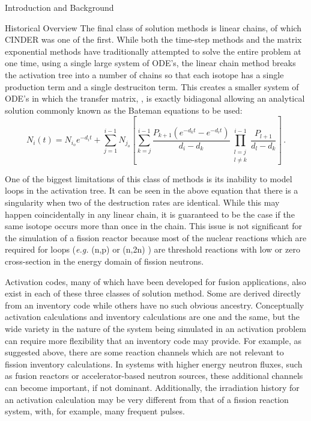 \begin{chapter}{Introduction and Background}
\begin{section}{Historical Overview}
  The final class of solution methods is linear chains, of which
  CINDER was one of the first.  While both the time-step methods and
  the matrix exponential methods have traditionally attempted to solve
  the entire problem at one time, using a single large system of
  ODE's, the linear chain method breaks the activation tree into a
  number of chains so that each isotope has a single production term
  and a single destruciton term.  This creates a smaller system of
  ODE's in which the transfer matrix, , is exactly bidiagonal
  allowing an analytical solution commonly known as the Bateman
  equations to be used:
  \begin{equation}
    \label{intro.bateman}
    N_i(t) = N_{i_o}e^{-d_i t} + \sum_{j=1}^{i-1}N_{j_o}\left [
      \sum_{k=j}^{i-1}\frac{P_{k+1}(e^{-d_k t} - e^{-d_i t})}{d_i -
        d_k}\prod_{\substack{l=j\\l\neq k}}^{i-1}\frac{P_{l+1}}{d_l-d_k}\right] \, .
  \end{equation}
  
  One of the biggest limitations of this class of methods is its
  inability to model loops in the activation tree.  It can be seen in
  the above equation that there is a singularity when two of the
  destruction rates are identical.  While this may happen
  coincidentally in any linear chain, it is guaranteed to be the case
  if the same isotope occurs more than once in the chain.  This issue
  is not significant for the simulation of a fission reactor because
  most of the nuclear reactions which are required for loops
  (\textsl{e.g.} (n,p) or (n,2n) ) are threshold reactions with low or
  zero cross-section in the energy domain of fission neutrons.
  
  Activation codes, many of which have been developed for fusion
  applications, also exist in each of these three classes of solution
  method.  Some are derived directly from an inventory code while
  others have no such obvious ancestry.  Conceptually activation
  calculations and inventory calculations are one and the same, but
  the wide variety in the nature of the system being simulated in an
  activation problem can require more flexibility that an inventory
  code may provide.  For example, as suggested above, there are some
  reaction channels which are not relevant to fission inventory
  calculations.  In systems with higher energy neutron fluxes, such as
  fusion reactors or accelerator-based neutron sources, these
  additional channels can become important, if not dominant.
  Additionally, the irradiation history for an activation calculation
  may be very different from that of a fission reaction system, with,
  for example, many frequent pulses.
  

\end{section}
\end{chapter}
